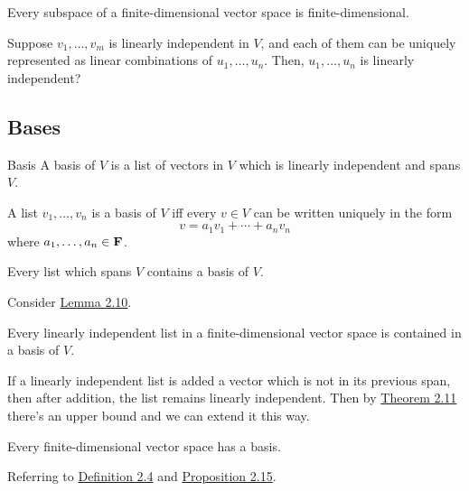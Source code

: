 \documentclass[12pt,a4paper]{article}
\begin{document}
    \begin{thm}\label{2.12}
        Every subspace of a finite-dimensional vector space is finite-dimensional.
    \end{thm}
    \hfill

    \begin{question} 
        Suppose $v_1,\dots,v_m$ is linearly independent in $V$, and each of them can be uniquely represented as linear combinations of $u_1,\dots,u_n$. Then, $u_1,\dots,u_n$ is linearly independent? 
    \end{question}

    \subsection{Bases}
    \begin{defi}{Basis}
        A basis of $V$ is a list of vectors in $V$ which is linearly independent and spans $V$.
    \end{defi}
    \hfill
    
    \begin{prop}
        A list $v_1,\dots,v_n$ is a basis of $V$ iff every $v\in V$ can be written uniquely in the form
        $$v=a_1v_1+\cdots+a_nv_n$$
        where $a_1,\dots,a_n\in\mathbf{F}$.
    \end{prop}
    \hfill
    
    \begin{prop}\label{2.15}
        Every list which spans $V$ contains a basis of $V$.
    \end{prop}
    \begin{remark}
        Consider \hyperref[2.10]{Lemma 2.10}.
    \end{remark}
    \hfill
    
    \begin{prop}\label{2.16}
        Every linearly independent list in a finite-dimensional vector space is contained in a basis of $V$.
    \end{prop}
    \begin{remark}
        If a linearly independent list is added a vector which is not in its previous span, then after addition, the list remains linearly independent. Then by \hyperref[2.11]{Theorem 2.11} there's an upper bound and we can extend it this way.
    \end{remark}
    \hfill
    
    \begin{prop}\label{2.17}
        Every finite-dimensional vector space has a basis.
    \end{prop}
    \begin{remark}
        Referring to \hyperref[2.4]{Definition 2.4} and \hyperref[2.15]{Proposition 2.15}.
    \end{remark}
    \hfill
\end{document}
